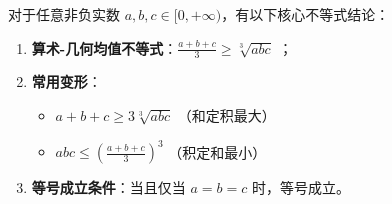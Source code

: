 \begin{statementbox}
对于任意非负实数 $a, b, c \in [0, +\infty)$，有以下核心不等式结论：
\begin{enumerate}
    \item \textbf{算术-几何均值不等式}：$\frac{a+b+c}{3} \geqslant \sqrt[3]{abc}$ ；
    \item \textbf{常用变形}：
    \begin{itemize}
        \item $a+b+c \geqslant 3\sqrt[3]{abc}$ （和定积最大）
        \item $abc \leqslant \left(\frac{a+b+c}{3}\right)^3$ （积定和最小）
    \end{itemize}
    \item \textbf{等号成立条件}：当且仅当 $a = b = c$ 时，等号成立。
\end{enumerate}
\end{statementbox}